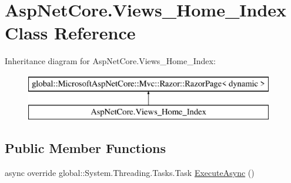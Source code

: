 \hypertarget{class_asp_net_core_1_1_views___home___index}{}\section{Asp\+Net\+Core.\+Views\+\_\+\+Home\+\_\+\+Index Class Reference}
\label{class_asp_net_core_1_1_views___home___index}
Inheritance diagram for Asp\+Net\+Core.\+Views\+\_\+\+Home\+\_\+\+Index\+:\begin{figure}[H]
\begin{center}
\leavevmode
\includegraphics[height=2.000000cm]{class_asp_net_core_1_1_views___home___index}
\end{center}
\end{figure}
\subsection*{Public Member Functions}
\begin{DoxyCompactItemize}
\item 
async override global\+::\+System.\+Threading.\+Tasks.\+Task \mbox{\hyperlink{class_asp_net_core_1_1_views___home___index_a2e2b2029628bc7b5b597c00591249147}{Execute\+Async}} ()
\end{DoxyCompactItemize}
